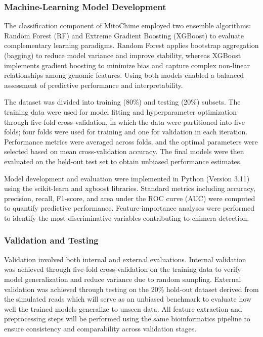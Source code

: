 \documentclass{article}
\begin{document}
 \subsubsection{Machine-Learning Model Development} 
 The classification component of MitoChime employed two ensemble algorithms: Random Forest (RF) and Extreme Gradient Boosting (XGBoost) to evaluate complementary learning paradigms. Random Forest applies bootstrap aggregation (bagging) to reduce model variance and improve stability, whereas XGBoost implements gradient boosting to minimize bias and capture complex non-linear relationships among genomic features. Using both models enabled a balanced assessment of predictive performance and interpretability.

 The dataset was divided into training (80\%) and testing (20\%) subsets. The training data were used for model fitting and hyperparameter optimization through five-fold cross-validation, in which the data were partitioned into five folds; four folds were used for training and one for validation in each iteration. Performance metrics were averaged across folds, and the optimal parameters were selected based on mean cross-validation accuracy. The final models were then evaluated on the held-out test set to obtain unbiased performance estimates.

Model development and evaluation were implemented in Python (Version 3.11) using the scikit-learn and xgboost libraries. Standard metrics including accuracy, precision, recall, F1-score, and area under the ROC curve (AUC) were computed to quantify predictive performance. Feature-importance analyses were performed to identify the most discriminative variables contributing to chimera detection.

 \subsubsection{Validation and Testing} 
Validation involved both internal and external evaluations. Internal validation was achieved through five-fold cross-validation on the training data to verify model generalization and reduce variance due to random sampling. External validation was achieved through testing on the 20\% hold-out dataset derived from the simulated reads which will serve as an unbiased benchmark to evaluate how well the trained models generalize to unseen data. All feature extraction and preprocessing steps will be performed using the same bioinformatics pipeline to ensure consistency and comparability across validation stages.
\end{document}

